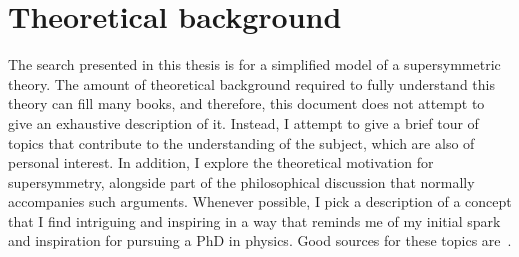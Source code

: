 \chapter{Theoretical background}
\label{sec:theory}

The search presented in this thesis is for a simplified model of a supersymmetric theory. The amount of theoretical background required to fully understand this theory can fill many books, and therefore, this document does not attempt to give an exhaustive description of it. Instead, I attempt to give a brief tour of topics that contribute to the understanding of the subject, which are also of personal interest. In addition, I explore the theoretical motivation for supersymmetry, alongside part of the philosophical discussion that normally accompanies such arguments. Whenever possible, I pick a description of a concept that I find intriguing and inspiring in a way that reminds me of my initial spark and inspiration for pursuing a PhD in physics. Good sources for these topics are~\cite{Peskin2019-bt,Srednicki2007-mn}.


